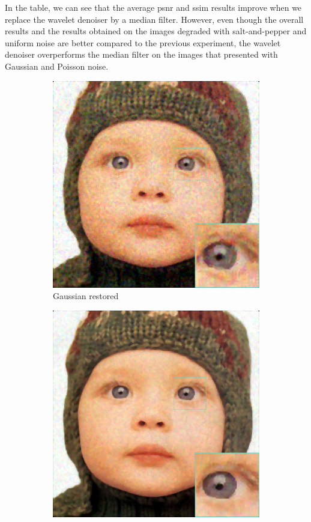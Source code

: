 In the table, we can see that the average \gls{psnr} and \gls{ssim} results improve when we replace the wavelet denoiser by a median filter. However, even though the overall results and the results obtained on the images degraded with salt-and-pepper and uniform noise are better compared to the previous experiment, the wavelet denoiser overperforms the median filter on the images that presented with Gaussian and Poisson noise.

\begin{figure}
	\centering
	\begin{subfigure}{0.24\textwidth}
		\includegraphics[width=\textwidth]{images/exp2.3/gaussian.png}
		\caption{Gaussian restored}
	\end{subfigure}
	\begin{subfigure}{0.24\textwidth}
		\includegraphics[width=\textwidth]{images/exp2.3/poisson.png}

\end{subfigure}
\end{figure}
